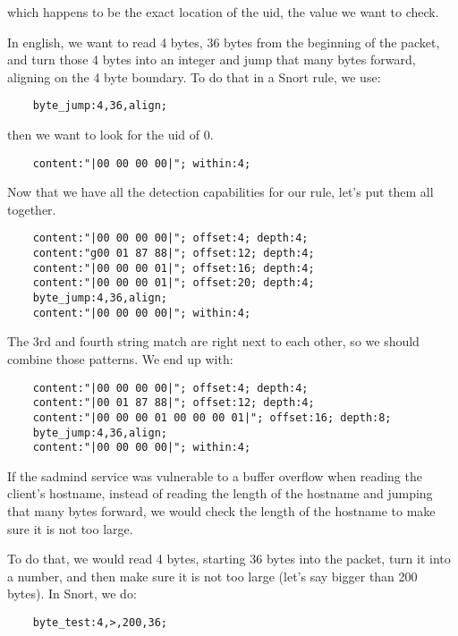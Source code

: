 \documentclass[english]{report}
\begin{document}
which happens to be the exact location of the uid, the value we want to check.

In english, we want to read 4 bytes, 36 bytes from the beginning of the packet, and turn those 4 bytes into an integer and jump that many bytes forward, aligning on the 4 byte boundary.  To do that in a Snort rule, we use:

\begin{verbatim}
    byte_jump:4,36,align;
\end{verbatim}

then we want to look for the uid of 0.

\begin{verbatim}
    content:"|00 00 00 00|"; within:4;
\end{verbatim}

Now that we have all the detection capabilities for our rule, let's put them all together.  

\begin{verbatim}
    content:"|00 00 00 00|"; offset:4; depth:4;
    content:"g00 01 87 88|"; offset:12; depth:4;
    content:"|00 00 00 01|"; offset:16; depth:4;
    content:"|00 00 00 01|"; offset:20; depth:4;
    byte_jump:4,36,align;
    content:"|00 00 00 00|"; within:4;
\end{verbatim}

The 3rd and fourth string match are right next to each other, so we should combine those patterns.  We end up with:

\begin{verbatim}
    content:"|00 00 00 00|"; offset:4; depth:4;
    content:"|00 01 87 88|"; offset:12; depth:4;
    content:"|00 00 00 01 00 00 00 01|"; offset:16; depth:8;
    byte_jump:4,36,align;
    content:"|00 00 00 00|"; within:4;
\end{verbatim}

If the sadmind service was vulnerable to a buffer overflow when reading the client's hostname, instead of reading the length of the hostname and jumping that many bytes forward, we would check the length of the hostname to make sure it is not too large.  

To do that, we would read 4 bytes, starting 36 bytes into the packet, turn it into a number, and then make sure it is not too large (let's say bigger than 200 bytes).  In Snort, we do: 

\begin{verbatim}
    byte_test:4,>,200,36;
\end{verbatim}
    
\end{document}
